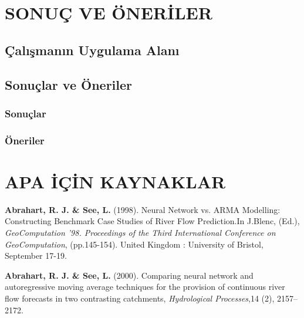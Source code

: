 \documentclass[a4paper,oneside,12pt]{report}
\begin{document}
\chapter{SONUÇ VE ÖNERİLER}
\label{chap:bolum6}
\lipsum[1][1-6]
\section{Çalışmanın Uygulama Alanı}
\label{sec:bolum61}
\lipsum[1][1-5]
\section{Sonuçlar ve Öneriler}
\label{sec:bolum62}
\lipsum[1][1-5]
\subsection{Sonuçlar}
\label{subsec:bolum621}
\lipsum[1][1-7]
\subsection{Öneriler}
\label{subsec:bolum622}
\lipsum[1][1-5]

\nocite{*}
 
 
 
\chapter*{APA İÇİN KAYNAKLAR}
\singlespacing

\leftskip 25mm \parindent -22mm \textbf{Abrahart, R. J. \& See, L.} (1998). Neural Network vs. ARMA Modelling: Constructing Benchmark Case Studies of River Flow Prediction.In J.Blenc, (Ed.), \textit{GeoComputation ’98. Proceedings of the Third International Conference on GeoComputation}, (pp.145-154). United Kingdom : University of Bristol, September 17-19.

\leftskip 25mm \parindent -22mm \textbf{Abrahart, R. J. \& See, L.} (2000). Comparing neural network and autoregressive moving average techniques for the provision of continuous river flow forecasts in two contrasting catchments, \textit{Hydrological Processes},14 (2), 2157–2172.


\setlength{\parindent}{0pt}  %
\setlength{\leftskip}{0pt}  %
\setlength{\rightskip}{0pt} %

\appendix
\singlespacing
\end{document}
